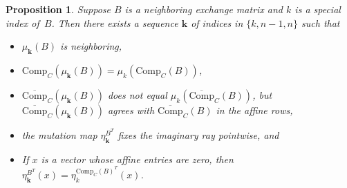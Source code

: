 \documentclass{amsart}
\newtheorem{proposition}{Proposition}[section]
\theoremstyle{definition}
\theoremstyle{remark}
\numberwithin{equation}{section}
\newcommand{\set}[1]{{\lbrace #1 \rbrace}}
\newcommand{\0}{{\mathbf{0}}}
\newcommand{\Comp}{\mathrm{Comp}_C}
\newcommand{\CompPlus}{\overline{\mathrm{Comp}}_C}
\newcommand{\kk}{\mathbf{k}}
\begin{document}
\begin{proposition}\label{special mut}
Suppose $B$ is a neighboring exchange matrix and $k$ is a special index of~$B$.
Then there exists a sequence $\kk$ of indices in $\set{k,n-1,n}$ such that 
\begin{itemize}
\item
$\mu_\kk(B)$ is neighboring,
\item
$\Comp(\mu_\kk(B))=\mu_k(\Comp(B))$,
\item
$\CompPlus(\mu_\kk(B))$ does not equal $\mu_k(\CompPlus(B))$, but $\CompPlus(\mu_\kk(B))$ agrees with $\CompPlus(B)$ in the affine rows,
\item
the mutation map $\eta^{B^T}_\kk$ fixes the imaginary ray pointwise, and 
\item
If $x$ is a vector whose affine entries are zero, then $\eta^{B^T}_\kk(x)=\eta^{\Comp(B)^T}_k(x)$.
\end{itemize}
\end{proposition}
\end{document}
